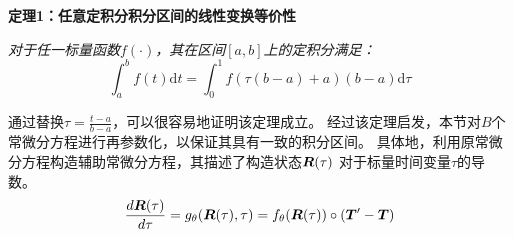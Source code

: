 \textbf{定理1：任意定积分积分区间的线性变换等价性}

\textit{对于任一标量函数$f(\cdot)$，其在区间$[a, b]$上的定积分满足：}
\begin{equation}
\int_{a}^bf(t) \text{d}t=\int_{0}^1f(\tau(b-a)+a) (b-a)\text{d}\tau
\end{equation}

通过替换$\tau = \frac{t-a}{b-a}$，可以很容易地证明该定理成立。
经过该定理启发，本节对$B$个常微分方程进行再参数化，以保证其具有一致的积分区间。
具体地，利用原常微分方程构造辅助常微分方程，其描述了构造状态$\boldsymbol{R}(\tau)$ 对于标量时间变量$\tau$的导数。
\begin{equation}
    \frac{d\boldsymbol R(\tau)}{d\tau}=g_{\theta}(\boldsymbol R(\tau), \tau)=f_\theta(\boldsymbol R(\tau))\circ (\boldsymbol{T}'-\boldsymbol{T})
\label{equ:construct_ode}
\end{equation}

